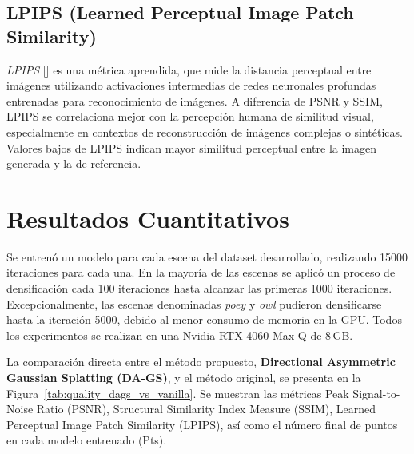 \subsection{LPIPS (Learned Perceptual Image Patch Similarity)}
\emph{LPIPS} [\cite{zhang2018unreasonable}] es una métrica aprendida, que mide la distancia perceptual entre imágenes utilizando activaciones intermedias de redes neuronales profundas entrenadas para reconocimiento de imágenes. A diferencia de PSNR y SSIM, LPIPS se correlaciona mejor con la percepción humana de similitud visual, especialmente en contextos de reconstrucción de imágenes complejas o sintéticas. Valores bajos de LPIPS indican mayor similitud perceptual entre la imagen generada y la de referencia.




\section{Resultados Cuantitativos}

Se entrenó un modelo para cada escena del dataset desarrollado, realizando 15000 iteraciones para cada una. En la mayoría de las escenas se aplicó un proceso de densificación cada 100 iteraciones hasta alcanzar las primeras 1000 iteraciones. Excepcionalmente, las escenas denominadas \textit{poey} y \textit{owl} pudieron densificarse hasta la iteración 5000, debido al menor consumo de memoria en la GPU. Todos los experimentos se realizan en una Nvidia RTX 4060 Max-Q de 8\,GB.

La comparación directa entre el método propuesto, \textbf{Directional Asymmetric Gaussian Splatting (DA-GS)}, y el método original, se presenta en la Figura~\ref{tab:quality_dags_vs_vanilla}. Se muestran las métricas Peak Signal-to-Noise Ratio (PSNR), Structural Similarity Index Measure (SSIM), Learned Perceptual Image Patch Similarity (LPIPS), así como el número final de puntos en cada modelo entrenado (Pts).

